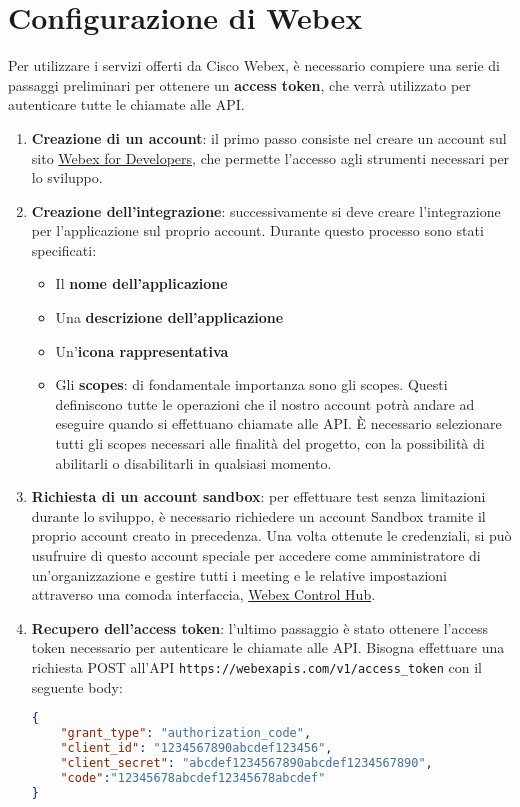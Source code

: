 \section{Configurazione di Webex}
Per utilizzare i servizi offerti da Cisco Webex, è necessario compiere una serie di passaggi
preliminari per ottenere un \textbf{access token}, che verrà utilizzato per autenticare tutte le chiamate alle API.

\begin{enumerate}

    \item \textbf{Creazione di un account}: il primo passo consiste nel creare
    un account sul sito \href{https://developer.webex.com/}{Webex for Developers}, che permette 
    l'accesso agli strumenti necessari per lo sviluppo.
    
    \item \textbf{Creazione dell'integrazione}: successivamente si deve creare l'integrazione per 
    l'applicazione sul proprio account. Durante questo processo sono stati specificati:
        \begin{itemize}
            \item Il \textbf{nome dell'applicazione}
            \item Una \textbf{descrizione dell'applicazione}
            \item Un'\textbf{icona rappresentativa}
            \item Gli \textbf{scopes}: di fondamentale importanza sono gli scopes. Questi definiscono tutte le operazioni
            che il nostro account potrà andare ad eseguire  quando si effettuano chiamate alle API. È necessario
            selezionare tutti gli scopes necessari alle finalità del progetto, con la possibilità di abilitarli 
            o disabilitarli in qualsiasi momento.
        \end{itemize}
 
    \item \textbf{Richiesta di un account sandbox}: per effettuare test senza limitazioni durante lo sviluppo,
    è necessario richiedere un account Sandbox tramite il proprio account creato in precedenza. Una volta ottenute
    le credenziali, si può usufruire di questo account speciale per accedere come amministratore di un'organizzazione 
    e gestire tutti i meeting e le relative impostazioni attraverso una comoda interfaccia, 
    \href{https://admin.webex.com/login}{Webex Control Hub}.
    \cite{WebexSandboxAccount}

    \item \textbf{Recupero dell'access token}: l'ultimo passaggio è stato ottenere l'access token 
    necessario per autenticare le chiamate alle API.
    Bisogna effettuare una richiesta POST all'API
    \texttt{https://webexapis.com/v1/access\_token} con il seguente body:
    \begin{lstlisting}[language=json,firstnumber=1]
{
    "grant_type": "authorization_code",
    "client_id": "1234567890abcdef123456",
    "client_secret": "abcdef1234567890abcdef1234567890",
    "code":"12345678abcdef12345678abcdef"
}
    \end{lstlisting}


\end{enumerate}
